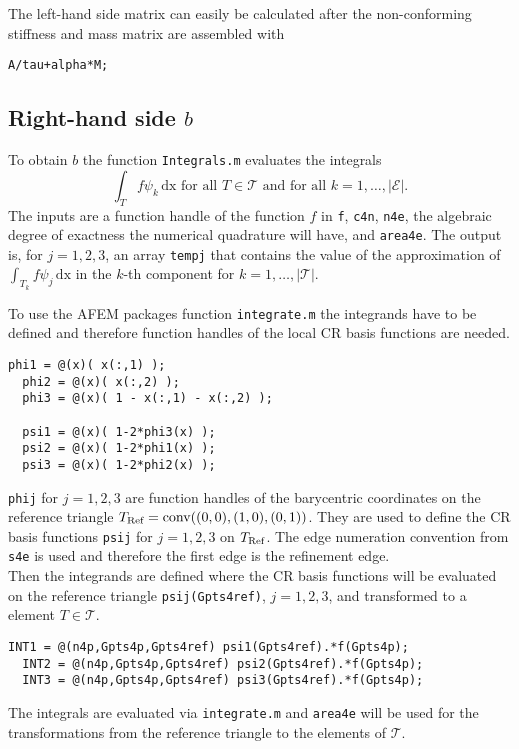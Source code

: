 The left-hand side matrix can easily be calculated after the non-conforming
stiffness and mass matrix are assembled with
\begin{lstlisting}[style=inline]
A/tau+alpha*M; 
\end{lstlisting}





\subsection{Right-hand side $b$}
To obtain $b$ the function \texttt{Integrals.m} evaluates the integrals 
$$
\int_T f\psi_k\,\mathrm{dx} \text{ for all } T\in\mathcal T \text{ and for all }
k=1,\dots,|\mathcal E|.
$$
The inputs are a function handle of the function $f$ in \texttt{f}, \texttt{c4n},
\texttt{n4e}, the algebraic degree of exactness the numerical quadrature will have, and 
\texttt{area4e}.
The output is, for $j=1,2,3$, an array 
\texttt{tempj} that contains the value of the approximation of 
$
\int_{T_k} f\psi_j\,\mathrm{dx} 
$
in the $k$-th component for $k=1,\dots,|\mathcal T|$.

To use the AFEM packages function \texttt{integrate.m} the integrands have to
be defined and therefore function handles of the local CR basis functions are needed.

\begin{lstlisting}[frame = single, numbers = none]
  phi1 = @(x)( x(:,1) );
  phi2 = @(x)( x(:,2) );
  phi3 = @(x)( 1 - x(:,1) - x(:,2) );
  
  psi1 = @(x)( 1-2*phi3(x) );
  psi2 = @(x)( 1-2*phi1(x) );
  psi3 = @(x)( 1-2*phi2(x) );
\end{lstlisting}
\texttt{phij} for $j=1,2,3$ are function handles of the barycentric coordinates 
on the reference triangle
$T_\textup{Ref}=\operatorname{conv}((0,0),(1,0),(0,1))$. They are used 
to define the CR basis functions \texttt{psij} for $j=1,2,3$ on $T_{\textup{Ref}}$. 
The edge numeration convention from \texttt{s4e} is used and therefore the first edge is the 
refinement edge.\\
Then the integrands are defined where the CR basis functions will be evaluated on the reference
triangle \texttt{psij(Gpts4ref)}, $j=1,2,3$, and transformed to a element $T\in\mathcal T$.
\begin{lstlisting}[frame=single,numbers=none]
  INT1 = @(n4p,Gpts4p,Gpts4ref) psi1(Gpts4ref).*f(Gpts4p);
  INT2 = @(n4p,Gpts4p,Gpts4ref) psi2(Gpts4ref).*f(Gpts4p);        
  INT3 = @(n4p,Gpts4p,Gpts4ref) psi3(Gpts4ref).*f(Gpts4p);
\end{lstlisting}
The integrals are evaluated via \texttt{integrate.m} and \texttt{area4e} will be used
for the transformations from the reference triangle to the elements of $\mathcal T$.

